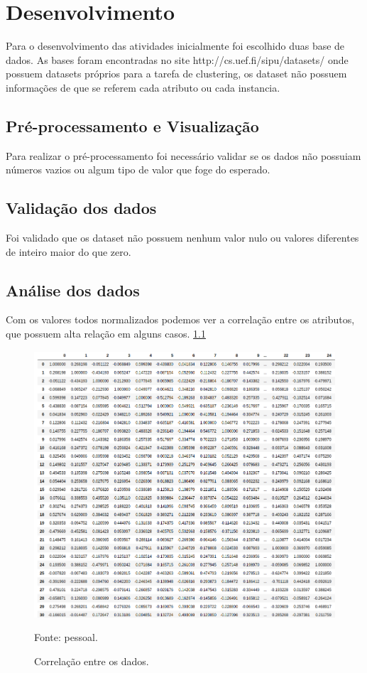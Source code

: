 \chapter{Desenvolvimento}\label{cap_desenv}

Para o desenvolvimento das atividades inicialmente foi escolhido duas base de dados. As bases foram encontradas no site http://cs.uef.fi/sipu/datasets/ onde possuem datasets próprios para a tarefa de clustering, os dataset não possuem informações de que se referem cada atributo ou cada instancia.

\section{Pré-processamento e Visualização}
Para realizar o pré-processamento foi necessário validar se os dados não possuiam números vazios ou algum tipo de valor que foge do esperado.


\section{Validação dos dados}
Foi validado que os dataset não possuem nenhum valor nulo ou valores diferentes de inteiro maior do que zero.

\section{Análise dos dados}
Com os valores todos normalizados podemos ver a correlação entre os atributos, que possuem alta relação em alguns casos. \ref{fig:correlacao}

\begin{figure}[h]
	\centering
	\includegraphics[width=0.7\linewidth]{images/corr}
	\caption{Correlação entre os dados.}
	Fonte: pessoal.
	\label{fig:correlacao}
\end{figure}

